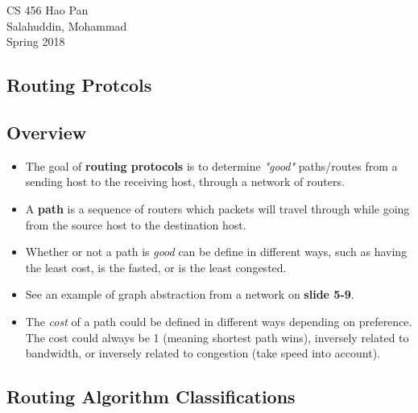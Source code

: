 \documentclass{article}
\begin{document}
\noindent
{CS 456 \hfill Hao Pan}\\
{Salahuddin, Mohammad}\\
{Spring 2018}


\begin{center}
\section{Routing Protcols}
\noindent
\end{center}

\subsection{Overview}

\begin{itemize}
\item The goal of {\bf routing protocols} is to determine \emph{"good"} paths/routes from a sending host to the receiving host, through a network of routers.
\item A {\bf path} is a sequence of routers which packets will travel through while going from the source host to the destination host.
\item Whether or not a path is \emph{good} can be define in different ways, such as having the least cost, is the fasted, or is the least congested.
\item See an example of graph abstraction from a network on {\bf slide 5-9}.
\item The \emph{cost} of a path could be defined in different ways depending on preference. The cost could always be 1 (meaning shortest path wins), inversely related to bandwidth, or inversely related to congestion (take speed into account).
\end{itemize}

\subsection{Routing Algorithm Classifications}
\end{document}
